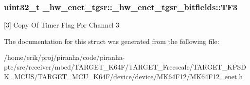 \subsubsection[{\texorpdfstring{T\+F3}{TF3}}]{\setlength{\rightskip}{0pt plus 5cm}uint32\+\_\+t \+\_\+hw\+\_\+enet\+\_\+tgsr\+::\+\_\+hw\+\_\+enet\+\_\+tgsr\+\_\+bitfields\+::\+T\+F3}\hypertarget{struct__hw__enet__tgsr_1_1__hw__enet__tgsr__bitfields_aea736b4adfff9def2d45e06a4e50dda3}{}\label{struct__hw__enet__tgsr_1_1__hw__enet__tgsr__bitfields_aea736b4adfff9def2d45e06a4e50dda3}
\mbox{[}3\mbox{]} Copy Of Timer Flag For Channel 3 

The documentation for this struct was generated from the following file\+:\begin{DoxyCompactItemize}
\item 
/home/erik/proj/piranha/code/piranha-\/ptc/src/receiver/mbed/\+T\+A\+R\+G\+E\+T\+\_\+\+K64\+F/\+T\+A\+R\+G\+E\+T\+\_\+\+Freescale/\+T\+A\+R\+G\+E\+T\+\_\+\+K\+P\+S\+D\+K\+\_\+\+M\+C\+U\+S/\+T\+A\+R\+G\+E\+T\+\_\+\+M\+C\+U\+\_\+\+K64\+F/device/device/\+M\+K64\+F12/M\+K64\+F12\+\_\+enet.\+h\end{DoxyCompactItemize}
